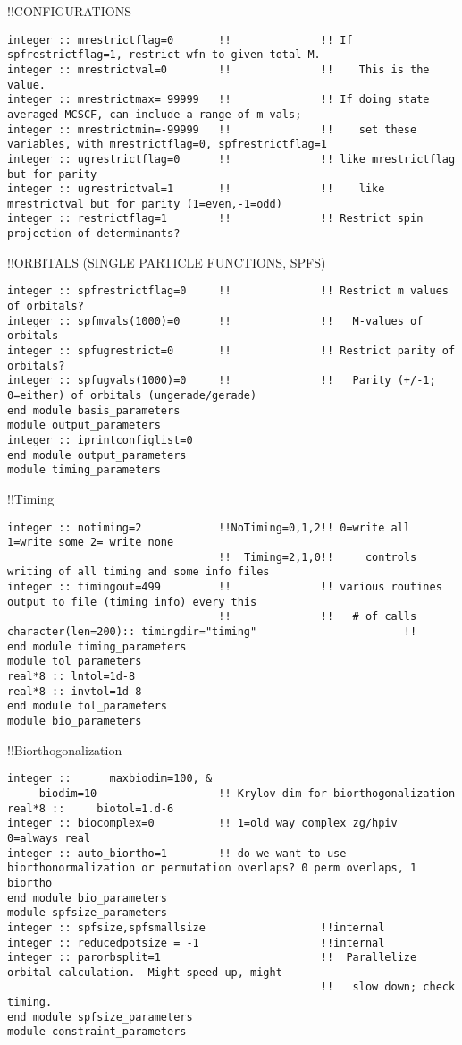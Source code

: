 !!{\large \quad CONFIGURATIONS}
\begin{verbatim}
integer :: mrestrictflag=0       !!              !! If spfrestrictflag=1, restrict wfn to given total M.
integer :: mrestrictval=0        !!              !!    This is the value.
integer :: mrestrictmax= 99999   !!              !! If doing state averaged MCSCF, can include a range of m vals;
integer :: mrestrictmin=-99999   !!              !!    set these variables, with mrestrictflag=0, spfrestrictflag=1
integer :: ugrestrictflag=0      !!              !! like mrestrictflag but for parity
integer :: ugrestrictval=1       !!              !!    like mrestrictval but for parity (1=even,-1=odd)
integer :: restrictflag=1        !!              !! Restrict spin projection of determinants?
\end{verbatim}
!!{\large \quad ORBITALS (SINGLE PARTICLE FUNCTIONS, SPFS)}
\begin{verbatim}
integer :: spfrestrictflag=0     !!              !! Restrict m values of orbitals?  
integer :: spfmvals(1000)=0      !!              !!   M-values of orbitals 
integer :: spfugrestrict=0       !!              !! Restrict parity of orbitals? 
integer :: spfugvals(1000)=0     !!              !!   Parity (+/-1; 0=either) of orbitals (ungerade/gerade)
end module basis_parameters
module output_parameters
integer :: iprintconfiglist=0
end module output_parameters
module timing_parameters
\end{verbatim}
!!{\large \quad Timing}
\begin{verbatim}
integer :: notiming=2            !!NoTiming=0,1,2!! 0=write all 1=write some 2= write none
                                 !!  Timing=2,1,0!!     controls writing of all timing and some info files
integer :: timingout=499         !!              !! various routines output to file (timing info) every this 
                                 !!              !!   # of calls
character(len=200):: timingdir="timing"                       !!
end module timing_parameters
module tol_parameters
real*8 :: lntol=1d-8
real*8 :: invtol=1d-8
end module tol_parameters
module bio_parameters
\end{verbatim}
!!{\large \quad Biorthogonalization }
\begin{verbatim}
integer ::      maxbiodim=100, &
     biodim=10                   !! Krylov dim for biorthogonalization
real*8 ::     biotol=1.d-6
integer :: biocomplex=0          !! 1=old way complex zg/hpiv  0=always real
integer :: auto_biortho=1        !! do we want to use biorthonormalization or permutation overlaps? 0 perm overlaps, 1 biortho
end module bio_parameters
module spfsize_parameters
integer :: spfsize,spfsmallsize                  !!internal
integer :: reducedpotsize = -1                   !!internal
integer :: parorbsplit=1                         !!  Parallelize orbital calculation.  Might speed up, might
                                                 !!   slow down; check timing.
end module spfsize_parameters
module constraint_parameters
\end{verbatim}

